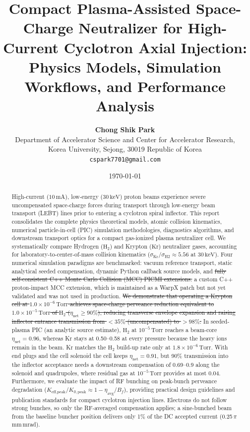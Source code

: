 \documentclass[11pt,a4paper]{article}
\title{\textbf{Compact Plasma-Assisted Space-Charge Neutralizer for High-Current Cyclotron Axial Injection: Physics Models, Simulation Workflows, and Performance Analysis}}
\author{\textbf{Chong Shik Park}\\[0.5em]
\small Department of Accelerator Science and Center for Accelerator Research,\\
\small Korea University, Sejong, 30019 Republic of Korea\\
\small \texttt{cspark7701@gmail.com}}
\date{\today}
\newcommand{\old}[1]{\textcolor{red!70!black}{\sout{#1}}}
\newcommand{\new}[1]{\textcolor{blue!60!black}{#1}}
\begin{document}
\maketitle

\begin{abstract}
High-current ($10\,\text{mA}$), low-energy ($30\,\text{keV}$) proton beams experience severe uncompensated space-charge forces during transport through low-energy beam transport (LEBT) lines prior to entering a cyclotron spiral inflector. This report consolidates the complete physics theoretical models, atomic collision kinematics, numerical particle-in-cell (PIC) simulation methodologies, diagnostics algorithms, and downstream transport optics for a compact gas-ionized plasma neutralizer cell. We systematically compare Hydrogen ($\text{H}_2$) and Krypton ($\text{Kr}$) neutralizer gases, accounting for laboratory-to-center-of-mass collision kinematics ($\sigma_{\text{Kr}} / \sigma_{\text{H2}} \approx 5.56$ at $30\,\text{keV}$). Four numerical simulation paradigms are benchmarked: vacuum reference transport, static analytical seeded compensation, dynamic Python callback source models, and \old{fully self-consistent C++ Monte Carlo Collision (MCC) PICMI extensions.} \new{a custom C++ proton-impact MCC extension, which is maintained as a WarpX patch but not yet validated and was not used in production.} \old{We demonstrate that operating a Krypton cell at $1.0 \times 10^{-6}\,\text{Torr}$ achieves space-charge perveance reduction equivalent to $1.0 \times 10^{-5}\,\text{Torr}$ of $\text{H}_2$ ($\eta_{\text{net}} \ge 90\%$), reducing transverse envelope expansion and raising inflector entrance transmission from $< 35\%$ (uncompensated) to $> 98\%$.} \new{In seeded-plasma PIC (an analytic source estimate), $\text{H}_2$ at $10^{-5}\,\text{Torr}$ reaches a beam-core $\eta_{\text{net}} = 0.96$, whereas Kr stays at 0.50--0.58 at every pressure because the heavy ions remain in the beam. Kr matches the $\text{H}_2$ build-up rate only at $1.8\times10^{-6}\,\text{Torr}$. With end plugs and the cell solenoid the cell keeps $\eta_{\text{net}} = 0.91$, but 90\% transmission into the inflector acceptance needs a downstream compensation of 0.69--0.9 along the solenoid and quadrupoles, where residual gas at $10^{-5}\,\text{Torr}$ provides at most 0.04.} Furthermore, we evaluate the impact of RF bunching on peak-bunch perveance degradation ($K_{\text{eff,peak}} / K_{0,\text{peak}} \approx 1 - \eta_{\text{avg}} / B_f$), providing practical design guidelines and publication standards for compact cyclotron injection lines. \new{Electrons do not follow strong bunches, so only the RF-averaged compensation applies; a sine-bunched beam from the baseline buncher position delivers only 1\% of the DC accepted current (0.25\,$\pi$\,mm\,mrad).}
\end{abstract}
\end{document}

